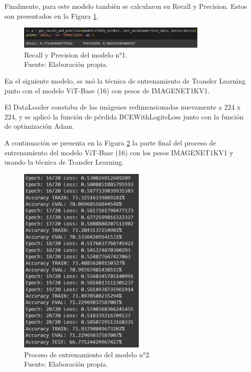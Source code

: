 Finalmente, para este modelo también se calcularon su Recall y Precision. Estos son presentados en la Figura \ref{4:fig121}.

\begin{figure}[H]
	\begin{center}
		\includegraphics[width=0.83\textwidth]{4/figures/model1_rp.PNG}
		\caption[Recall y Precision del modelo n°1]{Recall y Precision del modelo n°1. \\
		Fuente: Elaboración propia.}
		\label{4:fig121}
	\end{center}
\end{figure}

En el siguiente modelo, se usó la técnica de entrenamiento de Transfer Learning junto con el modelo ViT-Base (16) con pesos de IMAGENET1KV1.

El DataLoader constaba de las imágenes redimensionadas nuevamente a 224 x 224, y se aplicó la función de pérdida BCEWithLogitsLoss junto con la función de optimización Adam.

A continuación se presenta en la Figura \ref{4:fig122} la parte final del proceso de entrenamiento del modelo ViT-Base (16) con los pesos IMAGENET1KV1 y usando la técnica de Transfer Learning.

\begin{figure}[H]
	\begin{center}
		\includegraphics[width=0.55\textwidth]{4/figures/model2_train.PNG}
		\caption[Proceso de entrenamiento del modelo n°2]{Proceso de entrenamiento del modelo n°2. \\
		Fuente: Elaboración propia.}
		\label{4:fig122}
	\end{center}
\end{figure}

